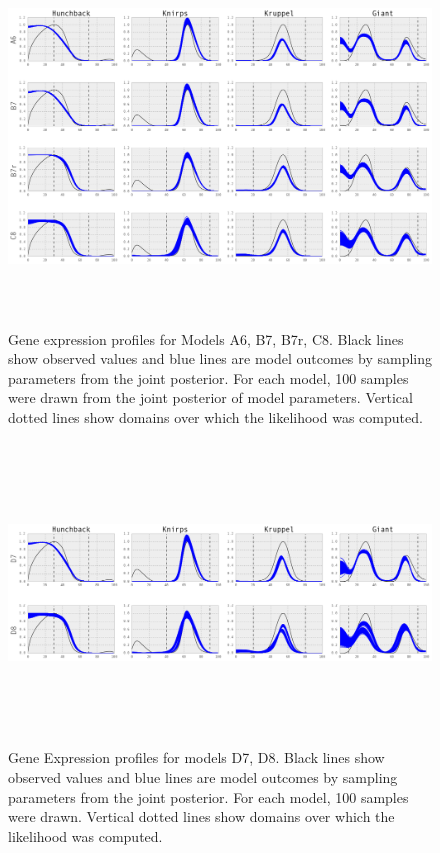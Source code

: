 \begin{figure}[h!]
\centering
\includegraphics[height = 10cm, width = 12.5cm]{embryo/figure-5.png}
\caption{Gene expression profiles for Models A6, B7, B7r, C8. Black lines show observed values and blue lines are model outcomes by sampling parameters from the joint posterior. For each model, 100 samples were drawn from the joint posterior of model parameters. Vertical dotted lines show domains over which the likelihood was computed.}
\label{fig:figure-5}
\end{figure}

\begin{figure}[h!]
\centering
\includegraphics[height = 8cm, width = 12.5cm]{embryo/model-predictions-d7-d8.png}
\caption{Gene Expression profiles for models D7, D8. Black lines show observed values and blue lines are model outcomes by sampling parameters from the joint posterior. For each model, 100 samples were drawn. Vertical dotted lines show domains over which the likelihood was computed.}
\label{fig:model-predictions-d7-d8}
\end{figure}

